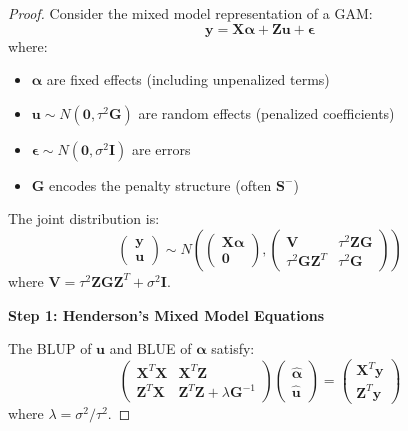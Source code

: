 \documentclass[12pt]{article}
\begin{document}
\begin{proof}
Consider the mixed model representation of a GAM:
\begin{equation}
\mathbf{y} = \mathbf{X}\boldsymbol{\alpha} + \mathbf{Z}\mathbf{u} + \boldsymbol{\epsilon}
\end{equation}
where:
\begin{itemize}
    \item $\boldsymbol{\alpha}$ are fixed effects (including unpenalized terms)
    \item $\mathbf{u} \sim N(\mathbf{0}, \tau^2\mathbf{G})$ are random effects (penalized coefficients)
    \item $\boldsymbol{\epsilon} \sim N(\mathbf{0}, \sigma^2\mathbf{I})$ are errors
    \item $\mathbf{G}$ encodes the penalty structure (often $\mathbf{S}^{-}$)
\end{itemize}

The joint distribution is:
\begin{equation}
\begin{pmatrix} \mathbf{y} \\ \mathbf{u} \end{pmatrix} \sim N\left(
\begin{pmatrix} \mathbf{X}\boldsymbol{\alpha} \\ \mathbf{0} \end{pmatrix},
\begin{pmatrix} \mathbf{V} & \tau^2\mathbf{Z}\mathbf{G} \\ \tau^2\mathbf{G}\mathbf{Z}^T & \tau^2\mathbf{G} \end{pmatrix}
\right)
\end{equation}
where $\mathbf{V} = \tau^2\mathbf{Z}\mathbf{G}\mathbf{Z}^T + \sigma^2\mathbf{I}$.

\textbf{Step 1: Henderson's Mixed Model Equations}

The BLUP of $\mathbf{u}$ and BLUE of $\boldsymbol{\alpha}$ satisfy:
\begin{equation}
\begin{pmatrix}
\mathbf{X}^T\mathbf{X} & \mathbf{X}^T\mathbf{Z} \\
\mathbf{Z}^T\mathbf{X} & \mathbf{Z}^T\mathbf{Z} + \lambda\mathbf{G}^{-1}
\end{pmatrix}
\begin{pmatrix}
\hat{\boldsymbol{\alpha}} \\
\hat{\mathbf{u}}
\end{pmatrix} =
\begin{pmatrix}
\mathbf{X}^T\mathbf{y} \\
\mathbf{Z}^T\mathbf{y}
\end{pmatrix}
\end{equation}
where $\lambda = \sigma^2/\tau^2$.


\end{proof}
\end{document}
